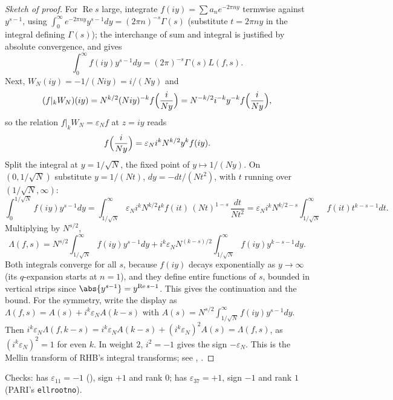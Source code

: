 \begin{proof}[Sketch of proof]
For $\operatorname{Re}s$ large, integrate $f(iy)=\sum a_ne^{-2\pi ny}$ termwise against $y^{s-1}$, using $\int_0^\infty e^{-2\pi ny}y^{s-1}dy=(2\pi n)^{-s}\Gamma(s)$ (substitute $t=2\pi ny$ in the
integral defining $\Gamma(s)$); the interchange of sum and integral is justified by absolute convergence, and gives
\[
\int_0^\infty f(iy)y^{s-1}dy=(2\pi)^{-s}\Gamma(s)L(f,s).
\]
Next, $W_N(iy)=-1/(Niy)=i/(Ny)$ and
\[
(f|_kW_N)(iy)=N^{k/2}(Niy)^{-k}f\Bigl(\frac i{Ny}\Bigr)=N^{-k/2}i^{-k}y^{-k}f\Bigl(\frac i{Ny}\Bigr),
\]
so the relation $f|_kW_N=\varepsilon_Nf$ at $z=iy$ reads
\[
f\Bigl(\frac{i}{Ny}\Bigr)=\varepsilon_Ni^kN^{k/2}y^kf(iy).
\]
Split the integral at $y=1/\sqrt N$, the fixed point of $y\mapsto1/(Ny)$. On $(0,1/\sqrt N)$ substitute $y=1/(Nt)$, $dy=-dt/(Nt^2)$, with $t$ running over $(1/\sqrt N,\infty)$:
\[
\int_0^{1/\sqrt N}f(iy)y^{s-1}dy=\int_{1/\sqrt N}^\infty\varepsilon_Ni^kN^{k/2}t^kf(it)\,(Nt)^{1-s}\,\frac{dt}{Nt^2}=\varepsilon_Ni^kN^{k/2-s}\int_{1/\sqrt N}^\infty f(it)t^{k-s-1}dt.
\]
Multiplying by $N^{s/2}$,
\[
\Lambda(f,s)=N^{s/2}\int_{1/\sqrt N}^\infty f(iy)y^{s-1}dy+i^k\varepsilon_NN^{(k-s)/2}\int_{1/\sqrt N}^\infty f(iy)y^{k-s-1}dy.
\]
Both integrals converge for all $s$, because $f(iy)$ decays exponentially as $y\to\infty$ (its $q$-expansion starts at $n=1$), and they define entire functions of $s$, bounded in vertical
strips since $\abs{y^{s-1}}=y^{\operatorname{Re}s-1}$. This gives the continuation and the bound. For the symmetry, write the display as $\Lambda(f,s)=A(s)+i^k\varepsilon_NA(k-s)$ with
$A(s)=N^{s/2}\int_{1/\sqrt N}^\infty f(iy)y^{s-1}dy$. Then $i^k\varepsilon_N\Lambda(f,k-s)=i^k\varepsilon_NA(k-s)+(i^k\varepsilon_N)^2A(s)=\Lambda(f,s)$, as $(i^k\varepsilon_N)^2=1$ for even $k$. In
weight $2$, $i^2=-1$ gives the sign $-\varepsilon_N$. This is the Mellin transform of RHB's integral transforms; see
\cite[Section 5.10]{DiamondShurman}, \cite[Section 4.3]{Miyake}.
\end{proof}

Checks:  has $\varepsilon_{11}=-1$ (), sign $+1$ and rank $0$;  has $\varepsilon_{37}=+1$, sign $-1$ and rank $1$ (PARI's \texttt{ellrootno}).

